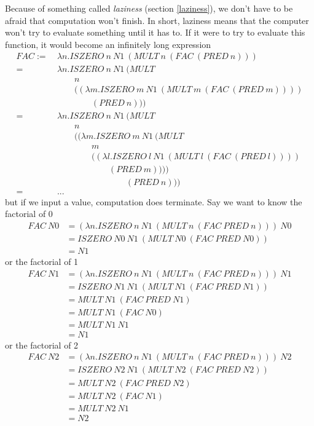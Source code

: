 \documentclass[11pt]{article}
\begin{document}
Because of something called \emph{laziness} (section \ref{laziness}), we don't
have to be afraid that computation won't finish. In short, laziness means that
the computer won't try to evaluate something until it has to. If it were to try
to evaluate this function, it would become an infinitely long expression
\begin{align*}
	FAC:=\ &\lambda n.ISZERO\ n\ N1\ (MULT\ n\ (FAC\ (PRED\ n))) \\
	=\ &\lambda n.ISZERO\ n\ N1\ (MULT\\
		&\qquad n\\
		&\qquad((\lambda m.ISZERO\ m\ N1\ (MULT\ m\ (FAC\ (PRED\ m))))\\
		&\qquad\qquad(PRED\ n))) \\
	=\ &\lambda n.ISZERO\ n\ N1\ (MULT\\
		&\qquad n\\
		&\qquad((\lambda m.ISZERO\ m\ N1\ (MULT\\
		&\qquad\qquad m\\
		&\qquad\qquad((\lambda l.ISZERO\ l\ N1\ (MULT\ l\ (FAC\ (PRED\ l))))\\
		&\qquad\qquad\qquad(PRED\ m))))\\
		&\qquad\qquad\qquad\qquad(PRED\ n))) \\
	=\ &...
\end{align*}
but if we input a value, computation does terminate. Say we want to know the
factorial of 0
\begin{align*}
	FAC\ N0&=(\lambda n.ISZERO\ n\ N1\ (MULT\ n\ (FAC\ PRED\ n)))\ N0\\
	&=ISZERO\ N0\ N1\ (MULT\ N0\ (FAC\ PRED\ N0))\\
	&=N1
\end{align*}
or the factorial of 1
\begin{align*}
	FAC\ N1&=(\lambda n.ISZERO\ n\ N1\ (MULT\ n\ (FAC\ PRED\ n)))\ N1\\
	&=ISZERO\ N1\ N1\ (MULT\ N1\ (FAC\ PRED\ N1))\\
	&=MULT\ N1\ (FAC\ PRED\ N1)\\
	&=MULT\ N1\ (FAC\ N0)\\
	&=MULT\ N1\ N1\\
	&=N1
\end{align*}
or the factorial of 2
\begin{align*}
	FAC\ N2&=(\lambda n.ISZERO\ n\ N1\ (MULT\ n\ (FAC\ PRED\ n)))\ N2\\
	&=ISZERO\ N2\ N1\ (MULT\ N2\ (FAC\ PRED\ N2))\\
	&=MULT\ N2\ (FAC\ PRED\ N2)\\
	&=MULT\ N2\ (FAC\ N1)\\
	&=MULT\ N2\ N1\\
	&=N2
\end{align*}
\end{document}
